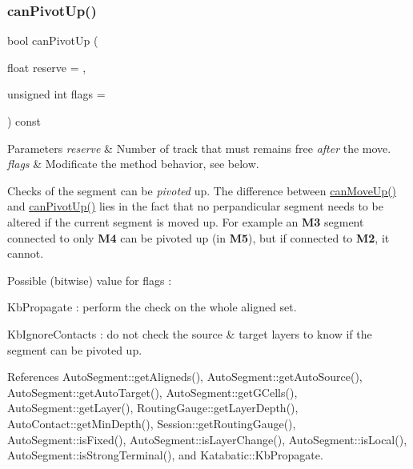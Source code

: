\mbox{\label{classKatabatic_1_1AutoSegment_a6cca3afced729492cae6649a92dc7e88}} 
\subsubsection{\texorpdfstring{can\+Pivot\+Up()}{canPivotUp()}}
{\footnotesize\ttfamily bool can\+Pivot\+Up (\begin{DoxyParamCaption}\item[{float}]{reserve = {},  }\item[{unsigned int}]{flags = {} }\end{DoxyParamCaption}) const}


\begin{DoxyParams}{Parameters}
{\em reserve} & Number of track that must remains free {\itshape after} the move. \\
\hline
{\em flags} & Modificate the method behavior, see below.\\
\hline
\end{DoxyParams}
Checks of the segment can be {\itshape pivoted} up. The difference between {\ttfamily \mbox{\hyperlink{classKatabatic_1_1AutoSegment_a6482341a342eb6e6b3b43f13fd4436f6}{can\+Move\+Up()}}} and {\ttfamily \mbox{\hyperlink{classKatabatic_1_1AutoSegment_a6cca3afced729492cae6649a92dc7e88}{can\+Pivot\+Up()}}} lies in the fact that no perpandicular segment needs to be altered if the current segment is moved up. For example an {\bfseries M3} segment connected to only {\bfseries M4} can be pivoted up (in {\bfseries M5}), but if connected to {\bfseries M2}, it cannot.

Possible (bitwise) value for {\ttfamily flags} \+:
\begin{DoxyItemize}
\item {\ttfamily Kb\+Propagate} \+: perform the check on the whole aligned set.
\item {\ttfamily Kb\+Ignore\+Contacts} \+: do not check the source \& target layers to know if the segment can be pivoted up. 
\end{DoxyItemize}

References Auto\+Segment\+::get\+Aligneds(), Auto\+Segment\+::get\+Auto\+Source(), Auto\+Segment\+::get\+Auto\+Target(), Auto\+Segment\+::get\+G\+Cells(), Auto\+Segment\+::get\+Layer(), Routing\+Gauge\+::get\+Layer\+Depth(), Auto\+Contact\+::get\+Min\+Depth(), Session\+::get\+Routing\+Gauge(), Auto\+Segment\+::is\+Fixed(), Auto\+Segment\+::is\+Layer\+Change(), Auto\+Segment\+::is\+Local(), Auto\+Segment\+::is\+Strong\+Terminal(), and Katabatic\+::\+Kb\+Propagate.

